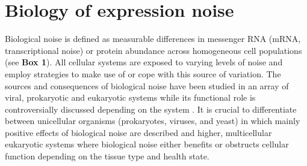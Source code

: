 
\section{Biology of expression noise} 

Biological noise is defined as measurable differences in messenger RNA (mRNA, transcriptional noise) or protein abundance across homogeneous cell populations (see \textbf{Box 1}). 
All cellular systems are exposed to varying levels of noise and employ strategies to make use of or cope with this source of variation. The sources and consequences of biological noise have been studied in an array of viral, prokaryotic and eukaryotic systems while its functional role is controversially discussed depending on the system \citep{Raj2010, Balazsi2011, Eldar2010}. It is crucial to differentiate between unicellular organisms (prokaryotes, viruses, and yeast) in which mainly positive effects of biological noise are described and higher, multicellular eukaryotic systems where biological noise either benefits or obstructs cellular function depending on the tissue type and health state.\\

